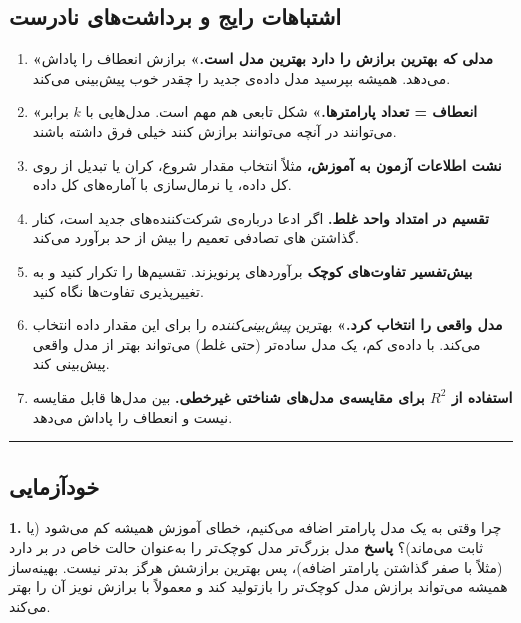 \subsection{اشتباهات رایج و برداشت‌های نادرست}

\begin{enumerate}
\def\labelenumi{\arabic{enumi}.}
\tightlist
\item
  \textbf{«مدلی که بهترین برازش را دارد بهترین مدل است.»} برازش انعطاف
  را پاداش می‌دهد. همیشه بپرسید مدل داده‌ی جدید را چقدر خوب پیش‌بینی می‌کند.
\item
  \textbf{«انعطاف = تعداد پارامترها.»} شکل تابعی هم مهم است. مدل‌هایی با
  \(k\) برابر می‌توانند در آنچه می‌توانند برازش کنند خیلی فرق داشته باشند.
\item
  \textbf{نشت اطلاعات آزمون به آموزش،} مثلاً انتخاب مقدار شروع، کران یا
  تبدیل از روی کل داده، یا نرمال‌سازی با آماره‌های کل داده.
\item
  \textbf{تقسیم در امتداد واحد غلط.} اگر ادعا درباره‌ی شرکت‌کننده‌های جدید
  است، کنار گذاشتن های تصادفی تعمیم را بیش از حد برآورد می‌کند.
\item
  \textbf{بیش‌تفسیر تفاوت‌های کوچک } برآوردهای  پرنویزند.
  تقسیم‌ها را تکرار کنید و به تغییرپذیری تفاوت‌ها نگاه کنید.
\item
  \textbf{ مدل واقعی را انتخاب کرد.»}  بهترین
  \emph{پیش‌بینی‌کننده} را برای این مقدار داده انتخاب می‌کند. با داده‌ی کم،
  یک مدل ساده‌تر (حتی غلط) می‌تواند بهتر از مدل واقعی پیش‌بینی کند.
\item
  \textbf{استفاده از \(R^2\) برای مقایسه‌ی مدل‌های شناختی غیرخطی.} بین
  مدل‌ها قابل مقایسه نیست و انعطاف را پاداش می‌دهد.
\end{enumerate}

\begin{center}\rule{0.5\linewidth}{0.5pt}\end{center}

\subsection{خودآزمایی}

\textbf{1.} چرا وقتی به یک مدل  پارامتر اضافه می‌کنیم، خطای
آموزش همیشه کم می‌شود (یا ثابت می‌ماند)؟ \textbf{پاسخ} مدل بزرگ‌تر مدل
کوچک‌تر را به‌عنوان حالت خاص در بر دارد (مثلاً با صفر گذاشتن پارامتر
اضافه)، پس بهترین برازشش هرگز بدتر نیست. بهینه‌ساز همیشه می‌تواند برازش
مدل کوچک‌تر را بازتولید کند و معمولاً با برازش نویز آن را بهتر می‌کند.


